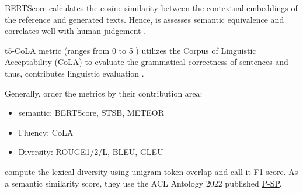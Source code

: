 BERTScore calculates the cosine similarity between the contextual embeddings of the reference and generated texts. 
Hence, is assesses semantic equivalence and correlates well with human judgement \cite{kurt_pehlivanoglu_comparative_2024}.

\ac{t5}-CoLA metric (ranges from 0 to 5 \cite{kurt_pehlivanoglu_comparative_2024}) utilizes the Corpus of Linguistic Acceptability (CoLA) to evaluate the grammatical correctness of sentences and thus, 
contributes linguistic evaluation \cite{kurt_pehlivanoglu_comparative_2024}.

Generally, \citet{kurt_pehlivanoglu_comparative_2024} order the metrics by their contribution area:
\begin{itemize}
    \item semantic: BERTScore, STSB, METEOR
    \item Fluency: CoLA
    \item Diversity: ROUGE1/2/L, BLEU, GLEU
\end{itemize}

\citet{krishna_paraphrasing_2023} compute the lexical diversity using unigram token overlap and call it F1 score.
As a semantic similarity score, they use the ACL Antology 2022 published \href{https://aclanthology.org/2022.emnlp-demos.38.pdf}{P-SP}.

